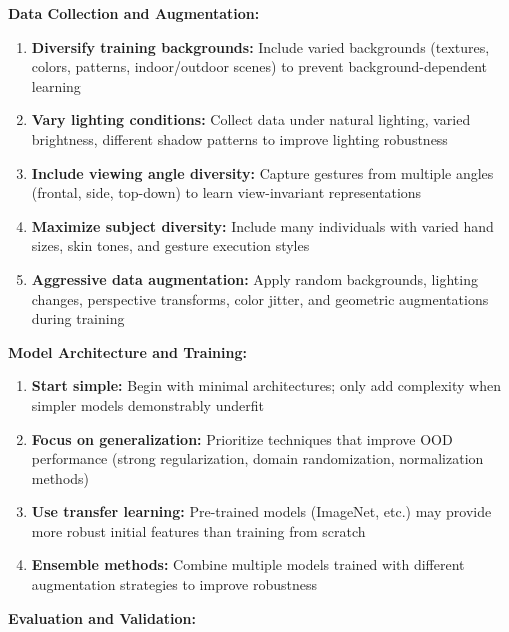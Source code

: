 \documentclass[12pt,a4paper]{article}
\begin{document}
\textbf{Data Collection and Augmentation:}

\begin{enumerate}
    \item \textbf{Diversify training backgrounds:} Include varied backgrounds (textures, colors, patterns, indoor/outdoor scenes) to prevent background-dependent learning
    
    \item \textbf{Vary lighting conditions:} Collect data under natural lighting, varied brightness, different shadow patterns to improve lighting robustness
    
    \item \textbf{Include viewing angle diversity:} Capture gestures from multiple angles (frontal, side, top-down) to learn view-invariant representations
    
    \item \textbf{Maximize subject diversity:} Include many individuals with varied hand sizes, skin tones, and gesture execution styles
    
    \item \textbf{Aggressive data augmentation:} Apply random backgrounds, lighting changes, perspective transforms, color jitter, and geometric augmentations during training
\end{enumerate}

\textbf{Model Architecture and Training:}

\begin{enumerate}
    \item \textbf{Start simple:} Begin with minimal architectures; only add complexity when simpler models demonstrably underfit
    
    \item \textbf{Focus on generalization:} Prioritize techniques that improve OOD performance (strong regularization, domain randomization, normalization methods)
    
    \item \textbf{Use transfer learning:} Pre-trained models (ImageNet, etc.) may provide more robust initial features than training from scratch
    
    \item \textbf{Ensemble methods:} Combine multiple models trained with different augmentation strategies to improve robustness
\end{enumerate}

\textbf{Evaluation and Validation:}
\end{document}
